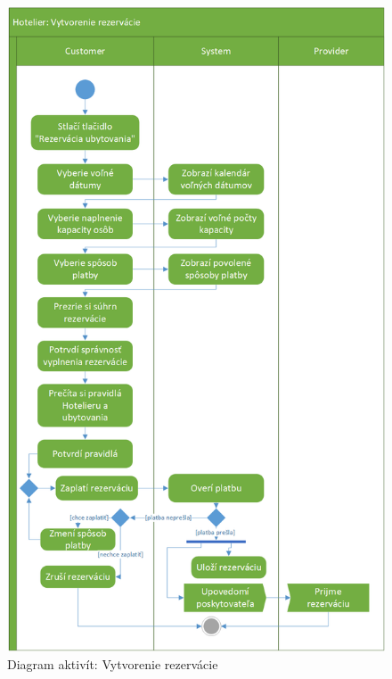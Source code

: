\begin{figure}[!htbp]
    \centering
    \includegraphics[width=.8\linewidth]{img/act_createReservation.png}
    \caption{Diagram aktivít: Vytvorenie rezervácie}
    \label{act_diagram_createRes}
\end{figure}

\newpage

